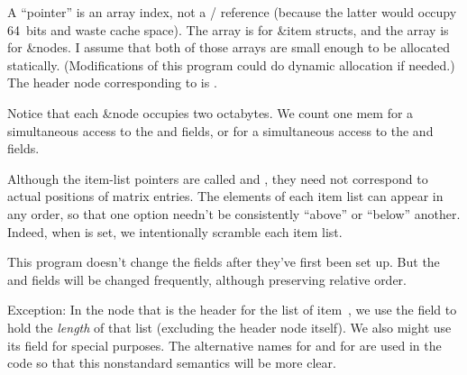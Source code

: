 A ``pointer'' is an array index, not a \CEE/ reference (because the latter
would occupy 64~bits and waste cache space). The  array is for
\&{item} structs, and the  array is for \&{node}s. I assume that
both of
those arrays are small enough to be allocated statically. (Modifications
of this program could do dynamic allocation if needed.)
The header node corresponding to  is .

Notice that each \&{node} occupies two octabytes.
We count one mem for a simultaneous access to the  and 
fields,
or for a simultaneous access to the  and  fields.

Although the item-list pointers are called  and , they
need not
correspond to actual positions of matrix entries. The elements of
each item list can appear in any order, so that one option
needn't be consistently ``above'' or ``below'' another. Indeed, when
 is set, we intentionally scramble each item list.

This program doesn't change the  fields after they've first been
set up.
But the  and  fields will be changed frequently,
although preserving
relative order.

Exception: In the node  that is the header for the list of
item~, we use the  field to hold the {\it length\/} of that
list (excluding the header node itself).
We also might use its  field for special purposes.
The alternative names  for  and  for 
are used in the code so that this nonstandard semantics will be more clear.

